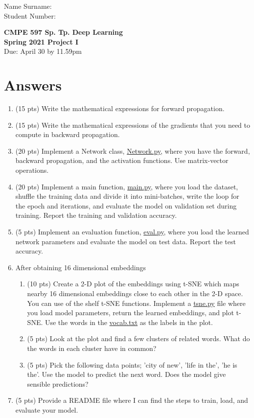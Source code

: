 \documentclass[12pt]{article}
\begin{document}
\begin{flushleft}
Name Surname: \\
Student Number:
\end{flushleft}
\begin{center}
{%
\textbf{CMPE 597 Sp. Tp. Deep Learning} \\
{\bf Spring 2021 Project I}\\
Due: April 30 by 11.59pm}%
\end{center}



\section*{Answers}
\begin{enumerate}
\item (15 pts) Write the mathematical expressions for forward propagation.
\item (15 pts) Write the mathematical expressions of the gradients that you need to compute in backward propagation.
\item (20 pts) Implement a Network class, \url{Network.py}, where you have the forward, backward propagation, and the activation functions. Use matrix-vector operations.
\item (20 pts) Implement a main function, \url{main.py}, where you load the dataset, shuffle the training data and divide it into mini-batches, write the loop for the epoch and iterations, and evaluate the model on validation set during training. Report the training and validation accuracy.
\item (5 pts) Implement an evaluation function, \url{eval.py}, where you load the learned network parameters and evaluate the model on test data. Report the test accuracy. 
\item After obtaining 16 dimensional embeddings
\begin{enumerate}
\item (10 pts) Create a 2-D plot of the embeddings using t-SNE which maps nearby 16 dimensional embeddings close to each other in the 2-D space. You can use of the shelf t-SNE functions. Implement a \url{tsne.py} file where you load model parameters, return the learned embeddings, and plot t-SNE. Use the words in the \url{vocab.txt} as the labels in the plot. 
\item (5 pts) Look at the plot and find a few
clusters of related words. What do the words in each cluster have in common?
\item (5 pts) Pick the following data points; 'city of new', 'life in the', 'he is the'. Use the model to predict the next word. Does
the model give sensible predictions?
\end{enumerate}
\item (5 pts) Provide a README file where I can find the steps to train, load, and evaluate your model.
\end{enumerate}
\end{document}
